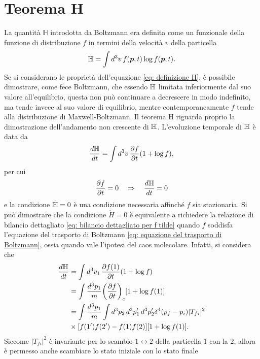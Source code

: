 \section{Teorema H}
La quantità $\mathbb{H}$ introdotta da Boltzmann era definita come un funzionale della funzione di distribuzione $f$ in termini della velocità $v$ della particella
\begin{equation}
\label{eq: definizione H}
    \mathbb{H} = \int d^3v\,f(\bm{p},t)\log{f(\bm{p},t)}.
\end{equation}
Se si considerano le proprietà dell'equazione \eqref{eq: definizione H}, è possibile dimostrare, come fece Boltzmann, che essendo $\mathbb{H}$ limitata inferiormente dal suo valore all'equilibrio, questa non può continuare a decrescere in modo indefinito, ma tende invece al suo valore di equilibrio, mentre contemporaneamente $f$ tende alla distribuzione di Maxwell-Boltzmann. Il teorema H riguarda proprio la dimostrazione dell'andamento non crescente di $\mathbb{H}$. L'evoluzione temporale di $\mathbb{H}$ è data da
\begin{equation}
    \frac{d\mathbb{H}}{dt} = \int d^3v\,\frac{\partial f}{\partial t}(1 + \log{f}),
\end{equation}
per cui 
\begin{equation}
\label{eq: condizione stazionarietà di f -> stazionarietà di H}
    \frac{\partial f}{\partial t} = 0 \quad\Rightarrow\quad \frac{d\mathbb{H}}{dt} = 0
\end{equation}
e la condizione $\dot{\mathbb{H}} = 0$ è una condizione necessaria affinché $f$ sia stazionaria. Si può dimostrare che la condizione $\dot{H} = 0$ è equivalente a richiedere la relazione di bilancio dettagliato \eqref{eq: bilancio dettagliato per f tilde} quando $f$ soddisfa l'equazione del trasporto di Boltzmann \eqref{eq: equazione del trasporto di Boltzmann}, ossia quando vale l'ipotesi del caos molecolare. Infatti, si considera che 
\begin{equation}
    \begin{split}
        \frac{d\mathbb{H}}{dt} &= \int d^3v_1\,\frac{\partial f(1)}{\partial t}(1 + \log{f}) \\
        &= \int\frac{d^3p_1}{m}\bigg(\frac{\partial f}{\partial t}\bigg)_c[1 + \log{f(1)}] \\
        &= \int\frac{d^3p_1}{m}\int d^3p_2\,d^3p_1'\,d^3p_2'\delta^4(p_f - p_i)|T_{fi}|^2 \\
        &\times[f(1')f(2') - f(1)f(2)][1 + \log{f(1)}].
    \end{split}
\end{equation}
Siccome $|T_{fi}|^2$ è invariante per lo scambio $1 \leftrightarrow 2$ della particella $1$ con la $2$, allora è permesso anche scambiare lo stato iniziale con lo stato finale

